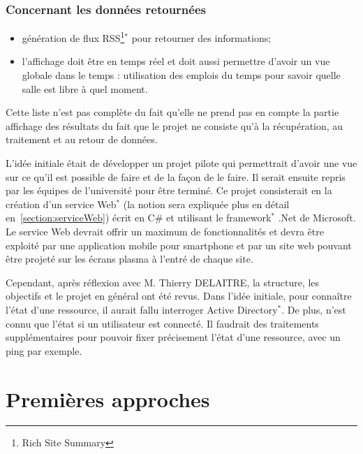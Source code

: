 \subsubsection{Concernant les donn\'ees retourn\'ees}

\begin{itemize}
	\item g\'en\'eration de flux RSS\protect\footnote{Rich Site Summary}$^*$ pour retourner des informations;
	\item l'affichage doit \^etre en temps r\'eel et doit aussi permettre d'avoir un vue globale dans le temps : utilisation des emplois du temps pour savoir quelle salle est libre \`a quel moment.

\end{itemize}

\vspace{0.20cm}

Cette liste n'est pas compl\`ete du fait qu'elle ne prend pas en compte la partie \og{}affichage\fg{} des r\'esultats du fait que le projet ne consiste qu'\`a la r\'ecup\'eration, au traitement et au retour de donn\'ees.

L'id\'ee initiale \'etait de d\'evelopper un projet pilote qui permettrait d'avoir une vue sur ce qu'il est possible de faire et de la fa\c{c}on de le faire.
Il serait ensuite repris par les \'equipes de l'universit\'e pour \^etre termin\'e.
Ce projet consisterait en la cr\'eation d'un service Web$^*$ (la notion sera expliqu\'ee plus en d\'etail en~\ref{section:serviceWeb}) \'ecrit en C\# et utilisant le framework$^*$ .Net de Microsoft.
Le service Web devrait offrir un maximum de fonctionnalit\'es et devra \^etre exploit\'e par une application mobile pour smartphone et par un site web pouvant \^etre projet\'e sur les \'ecrans plasma \`a l'entr\'e de chaque site.

Cependant, apr\`es r\'eflexion avec M. Thierry DELAITRE, la structure, les objectifs et le projet en g\'en\'eral ont \'et\'e revus.
Dans l'id\'ee initiale, pour conna\^itre l'\'etat d'une ressource, il aurait fallu interroger Active Directory$^*$. 
De plus, n'est connu que l'\'etat si un utilisateur est connect\'e.
Il faudrait des traitements suppl\'ementaires pour pouvoir fixer pr\'ecisement l'\'etat d'une ressource, avec un ping par exemple.

\section{Premi\`eres approches}


